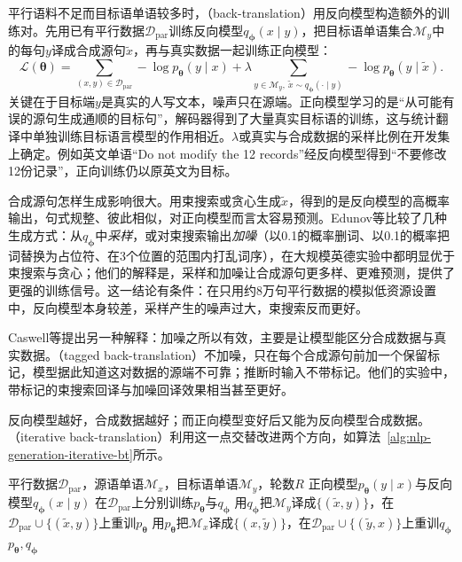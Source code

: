 平行语料不足而目标语单语较多时，（back-translation）用反向模型构造额外的训练对。先用已有平行数据$\mathcal D_{\mathrm{par}}$训练反向模型$q_{\bm\phi}(x\mid y)$，把目标语单语集合$\mathcal M_y$中的每句$y$译成合成源句$\tilde x$，再与真实数据一起训练正向模型：
\begin{equation}
  \mathcal L(\bm\theta)=\sum_{(x,y)\in\mathcal D_{\mathrm{par}}}-\log p_{\bm\theta}(y\mid x)
  +\lambda\sum_{y\in\mathcal M_y,\ \tilde x\sim q_{\bm\phi}(\cdot\mid y)}-\log p_{\bm\theta}(y\mid\tilde x).
  \label{eq:nlp-generation-back-translation}
\end{equation}
关键在于目标端$y$是真实的人写文本，噪声只在源端。正向模型学习的是“从可能有误的源句生成通顺的目标句”，解码器得到了大量真实目标语的训练，这与统计翻译中单独训练目标语言模型的作用相近。$\lambda$或真实与合成数据的采样比例在开发集上确定。例如英文单语“Do not modify the 12 records”经反向模型得到“不要修改12份记录”，正向训练仍以原英文为目标。

合成源句怎样生成影响很大。用束搜索或贪心生成$\tilde x$，得到的是反向模型的高概率输出，句式规整、彼此相似，对正向模型而言太容易预测。Edunov等比较了几种生成方式\cite{nlp-gen-edunov2018bt}：从$q_{\bm\phi}$中\emph{采样}，或对束搜索输出\emph{加噪}（以0.1的概率删词、以0.1的概率把词替换为占位符、在3个位置的范围内打乱词序），在大规模英德实验中都明显优于束搜索与贪心；他们的解释是，采样和加噪让合成源句更多样、更难预测，提供了更强的训练信号。这一结论有条件：在只用约8万句平行数据的模拟低资源设置中，反向模型本身较差，采样产生的噪声过大，束搜索反而更好。

Caswell等提出另一种解释\cite{nlp-gen-caswell2019tagged}：加噪之所以有效，主要是让模型能区分合成数据与真实数据。（tagged back-translation）不加噪，只在每个合成源句前加一个保留标记，模型据此知道这对数据的源端不可靠；推断时输入不带标记。他们的实验中，带标记的束搜索回译与加噪回译效果相当甚至更好。

反向模型越好，合成数据越好；而正向模型变好后又能为反向模型合成数据。（iterative back-translation）利用这一点交替改进两个方向\cite{nlp-gen-hoang2018iterative}，如算法~\ref{alg:nlp-generation-iterative-bt}所示。

\begin{algorithm}[迭代回译]
  \label{alg:nlp-generation-iterative-bt}
  \begin{algorithmic}[1]
    \Require 平行数据$\mathcal D_{\mathrm{par}}$，源语单语$\mathcal M_x$，目标语单语$\mathcal M_y$，轮数$R$
    \Ensure 正向模型$p_{\bm\theta}(y\mid x)$与反向模型$q_{\bm\phi}(x\mid y)$
    \State 在$\mathcal D_{\mathrm{par}}$上分别训练$p_{\bm\theta}$与$q_{\bm\phi}$
      \State 用$q_{\bm\phi}$把$\mathcal M_y$译成$\{(\tilde x,y)\}$，在$\mathcal D_{\mathrm{par}}\cup\{(\tilde x,y)\}$上重训$p_{\bm\theta}$
      \State 用$p_{\bm\theta}$把$\mathcal M_x$译成$\{(x,\tilde y)\}$，在$\mathcal D_{\mathrm{par}}\cup\{(\tilde y,x)\}$上重训$q_{\bm\phi}$
    \EndFor
    \State \Return $p_{\bm\theta},q_{\bm\phi}$
  \end{algorithmic}
\end{algorithm}

